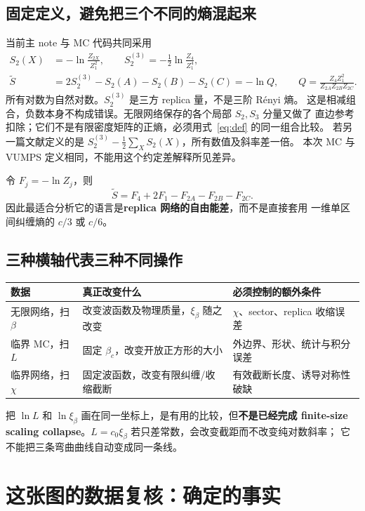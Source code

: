 \documentclass[11pt]{article}
\newcommand{\tS}{\widetilde S}
\newcommand{\xb}{\xi_\beta}
\begin{document}
\subsection{固定定义，避免把三个不同的熵混起来}
当前主 note 与 MC 代码共同采用
\begin{align}
 S_2(X)&=-\ln\frac{Z_{2X}}{Z_1^2},\qquad
 S_2^{(3)}=-\frac12\ln\frac{Z_4}{Z_1^4},\\
 \tS&=2S_2^{(3)}-S_2(A)-S_2(B)-S_2(C)
 =-\ln Q,\qquad
 Q=\frac{Z_4 Z_1^2}{Z_{2A}Z_{2B}Z_{2C}}.\label{eq:def}
\end{align}
所有对数为自然对数。$S_2^{(3)}$ 是三方 replica 量，不是三阶 Rényi 熵。
这是相减组合，负数本身不构成错误。无限网络保存的各个局部 $S_2,S_3$ 分量又做了
直边参考扣除；它们不是有限密度矩阵的正熵，必须用式~\eqref{eq:def} 的同一组合比较。
若另一篇文献定义的是 $S_2^{(3)}-\frac12\sum_XS_2(X)$，所有数值及斜率差一倍。
本次 MC 与 VUMPS 定义相同，不能用这个约定差解释所见差异。

令 $F_j=-\ln Z_j$，则
\begin{equation}
 \tS=F_4+2F_1-F_{2A}-F_{2B}-F_{2C}.\label{eq:freeenergy}
\end{equation}
因此最适合分析它的语言是\textbf{replica 网络的自由能差}，而不是直接套用
一维单区间纠缠熵的 $c/3$ 或 $c/6$。

\subsection{三种横轴代表三种不同操作}
\begin{center}\small
\begin{tabular}{p{.20\linewidth}p{.32\linewidth}p{.36\linewidth}}
\toprule
数据 & 真正改变什么 & 必须控制的额外条件\\
\midrule
无限网络，扫 $\beta$ & 改变波函数及物理质量，$\xb$ 随之改变 & $\chi$、sector、replica 收缩误差\\
临界 MC，扫 $L$ & 固定 $\beta_c$，改变开放正方形的大小 & 外边界、形状、统计与积分误差\\
临界网络，扫 $\chi$ & 固定波函数，改变有限纠缠/收缩截断 & 有效截断长度、诱导对称性破缺\\
\bottomrule
\end{tabular}
\end{center}
把 $\ln L$ 和 $\ln\xb$ 画在同一坐标上，是有用的比较，但\textbf{不是已经完成
finite-size scaling collapse}。$L=c_0\xb$ 若只差常数，会改变截距而不改变纯对数斜率；
它不能把三条弯曲曲线自动变成同一条线。

\section{这张图的数据复核：确定的事实}
\end{document}
